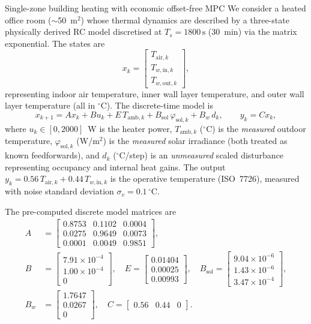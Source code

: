 \begin{examplebox}{Single-zone building heating with economic offset-free MPC}
We consider a heated office room ($\sim$50~m$^2$) whose thermal dynamics
are described by a three-state physically derived RC model discretised at
$T_s = 1800\,\text{s}$ (30~min) via the matrix exponential.
The states are
\[
x_k = \begin{bmatrix} T_{\mathrm{air},k} \\ T_{w,\mathrm{in},k} \\ T_{w,\mathrm{out},k} \end{bmatrix}\!,
\]
representing indoor air temperature, inner wall layer temperature, and
outer wall layer temperature (all in $^\circ$C).
The discrete-time model is
\[
x_{k+1} = A x_k + B u_k + E\,T_{\mathrm{amb},k}
+ B_{\mathrm{sol}}\,\varphi_{\mathrm{sol},k}
+ B_w\,d_k,
\qquad
y_k = C x_k,
\]
where $u_k \in [0, 2000]$~W is the heater power,
$T_{\mathrm{amb},k}$ ($^\circ$C) is the \emph{measured} outdoor temperature,
$\varphi_{\mathrm{sol},k}$ (W/m$^2$) is the \emph{measured} solar
irradiance (both treated as known feedforwards), and $d_k$
($^\circ$C/step) is an \emph{unmeasured} scaled disturbance representing
occupancy and internal heat gains. The output
$y_k = 0.56\,T_{\mathrm{air},k} + 0.44\,T_{w,\mathrm{in},k}$
is the operative temperature (ISO~7726), measured with noise standard
deviation $\sigma_v = 0.1\,^\circ$C.

The pre-computed discrete model matrices are
\begin{align*}
	A &= \begin{bmatrix} 0.8753 & 0.1102 & 0.0004 \\ 0.0275 & 0.9649 & 0.0073 \\ 0.0001 & 0.0049 & 0.9851 \end{bmatrix}, \\[6pt]
	B &= \begin{bmatrix} 7.91\times10^{-4} \\ 1.00\times10^{-4} \\ 0 \end{bmatrix}\!, \quad
	E  = \begin{bmatrix} 0.01404 \\ 0.00025 \\ 0.00993 \end{bmatrix}\!, \quad
	B_{\mathrm{sol}} = \begin{bmatrix} 9.04\times10^{-6} \\ 1.43\times10^{-6} \\ 3.47\times10^{-4} \end{bmatrix}\!, \\[6pt]
	B_w &= \begin{bmatrix} 1.7647 \\ 0.0267 \\ 0 \end{bmatrix}\!, \quad
	C  = \begin{bmatrix} 0.56 & 0.44 & 0 \end{bmatrix}.
\end{align*}


\end{examplebox}
